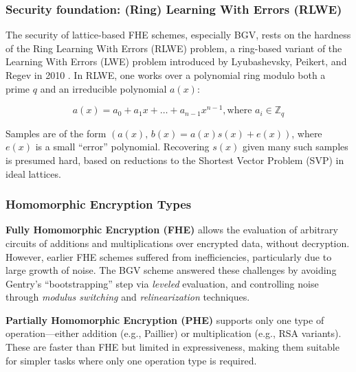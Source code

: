 \subsubsection{Security foundation: (Ring) Learning With Errors (RLWE)} \label{sec:rlwe}

The security of lattice-based FHE schemes, especially BGV, rests on the hardness of the Ring Learning With Errors (RLWE) problem, a ring-based variant of the Learning With Errors (LWE) problem introduced by Lyubashevsky, Peikert, and Regev in 2010 \cite{Lyubashevsky2010-jo}.
In RLWE, one works over a polynomial ring modulo both a prime $q$ and an irreducible polynomial $a(x)$:

\[
    a(x) = a_0 + a_1 x + \ldots + a_{n-1} x^{n-1}, \text{where } a_i \in \mathbb{Z}_q
\]

Samples are of the form $(a(x),\,b(x)=a(x)s(x)+e(x))$, where $e(x)$ is a small “error” polynomial. Recovering $s(x)$ given many such samples is presumed hard, based on reductions to the Shortest Vector Problem (SVP) in ideal lattices.

\subsubsection{Homomorphic Encryption Types}

\textbf{Fully Homomorphic Encryption (FHE)} allows the evaluation of arbitrary circuits of additions and multiplications over encrypted data, without decryption. However, earlier FHE schemes suffered from inefficiencies, particularly due to large growth of noise. The BGV scheme answered these challenges by avoiding Gentry’s “bootstrapping” \cite{brakerski2011leveled} step via \emph{leveled} evaluation, and controlling noise through \emph{modulus switching} and \emph{relinearization} techniques.

\textbf{Partially Homomorphic Encryption (PHE)} supports only one type of operation—either addition (e.g., Paillier) or multiplication (e.g., RSA variants). These are faster than FHE but limited in expressiveness, making them suitable for simpler tasks where only one operation type is required.

